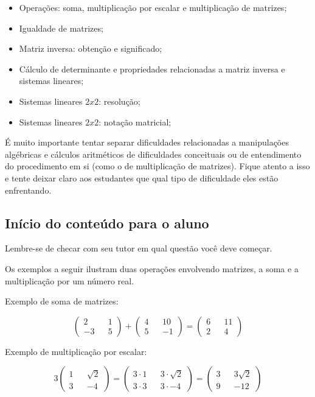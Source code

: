 \documentclass[main.tex]{subfiles}
\begin{document}
\begin{itemize}
 \item Operações: soma, multiplicação por escalar e multiplicação de matrizes;
 \item Igualdade de matrizes;
 \item Matriz inversa: obtenção e significado;
 \item Cálculo de determinante e propriedades relacionadas a matriz inversa e sistemas lineares;
 \item Sistemas lineares $2x2$: resolução;
 \item Sistemas lineares $2x2$: notação matricial;
\end{itemize}

É muito importante tentar separar dificuldades relacionadas a manipulações algébricas e cálculos aritméticos de dificuldades conceituais ou de entendimento do procedimento em si (como o de multiplicação de matrizes). Fique atento a isso e tente deixar claro aos estudantes que qual tipo de dificuldade eles estão enfrentando.

\subsection{Início do conteúdo para o aluno}

\paraAmbos

Lembre-se de checar com seu tutor em qual questão você deve começar.

Os exemplos a seguir ilustram duas operações envolvendo matrizes, a soma e a multiplicação por um número real.

\begin{caixaExemplo}
	Exemplo de soma de matrizes:

  $$\begin{pmatrix} 2 && 1 \\ -3 && 5 \end{pmatrix} + \begin{pmatrix} 4 && 10 \\ 5 && -1 \end{pmatrix} = \begin{pmatrix} 6 && 11 \\ 2 && 4  \end{pmatrix}$$
\end{caixaExemplo} 	

\begin{caixaExemplo}
	Exemplo de multiplicação por escalar:
 
 $$3 \begin{pmatrix} 1 && \sqrt{2} \\ 3 && -4 \end{pmatrix} = \begin{pmatrix} 3 \cdot 1 && 3 \cdot \sqrt{2} \\ 3 \cdot 3 && 3 \cdot -4 \end{pmatrix} = \begin{pmatrix} 3 && 3 \sqrt{2} \\ 9 && -12 \end{pmatrix}$$
\end{caixaExemplo}
\end{document}

